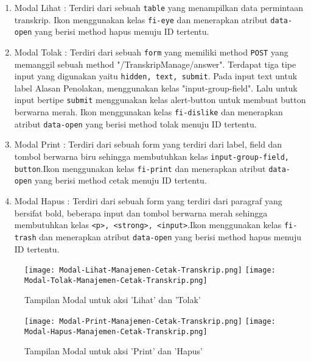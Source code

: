 \begin{enumerate}
	
	\item Modal Lihat : Terdiri dari sebuah \texttt{table} yang menampilkan data permintaan transkrip. Ikon menggunakan kelas \texttt{fi-eye} dan menerapkan atribut \texttt{data-open} yang berisi method hapus menuju ID tertentu.
	
	\item Modal Tolak : Terdiri dari sebuah \texttt{form} yang memiliki method \texttt{POST} yang memanggil sebuah method "/TranskripManage/answer". Terdapat tiga tipe input yang digunakan yaitu \texttt{hidden, text, submit}. Pada input text untuk label Alasan Penolakan, menggunakan kelas "input-group-field". Lalu untuk input bertipe \texttt{submit} menggunakan kelas alert-button untuk membuat button berwarna merah. Ikon menggunakan kelas \texttt{fi-dislike} dan menerapkan atribut \texttt{data-open} yang berisi method tolak menuju ID tertentu.
	
	\item Modal Print : Terdiri dari sebuah form yang terdiri dari label, field dan tombol berwarna biru sehingga membutuhkan kelas \verb|input-group-field, button|.Ikon menggunakan kelas \texttt{fi-print} dan menerapkan atribut \texttt{data-open} yang berisi method cetak menuju ID tertentu.
	
	\item Modal Hapus : Terdiri dari sebuah form yang terdiri dari paragraf yang bersifat bold, beberapa input dan tombol berwarna merah sehingga membutuhkan kelas \verb|<p>, <strong>, <input>|.Ikon menggunakan kelas \texttt{fi-trash} dan menerapkan atribut \texttt{data-open} yang berisi method hapus menuju ID tertentu.
\end{enumerate}

\begin{figure} [H]
	\centering  
	\texttt{[image: Modal-Lihat-Manajemen-Cetak-Transkrip.png]}  
	\texttt{[image: Modal-Tolak-Manajemen-Cetak-Transkrip.png]} 
	\caption{Tampilan Modal untuk aksi 'Lihat' dan 'Tolak'} 	
\end{figure}

\begin{figure} [H]
	\centering  
	\texttt{[image: Modal-Print-Manajemen-Cetak-Transkrip.png]}  
	\texttt{[image: Modal-Hapus-Manajemen-Cetak-Transkrip.png]} 
	\caption{Tampilan Modal untuk aksi 'Print' dan 'Hapus'} 	
\end{figure}


